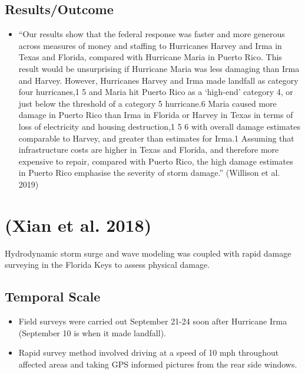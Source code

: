 \documentclass[
]{article}
\providecommand{\tightlist}{%
  \setlength{\itemsep}{0pt}\setlength{\parskip}{0pt}}
\begin{document}
\hypertarget{resultsoutcome-5}{%
\subsection{Results/Outcome}\label{resultsoutcome-5}}

\begin{itemize}
\tightlist
\item
  ``Our results show that the federal response was faster and more
  generous across measures of money and staffing to Hurricanes Harvey
  and Irma in Texas and Florida, compared with Hurricane Maria in Puerto
  Rico. This result would be unsurprising if Hurricane Maria was less
  damaging than Irma and Harvey. However, Hurricanes Harvey and Irma
  made landfall as category four hurricanes,1 5 and Maria hit Puerto
  Rico as a `high-end' category 4, or just below the threshold of a
  category 5 hurricane.6 Maria caused more damage in Puerto Rico than
  Irma in Florida or Harvey in Texas in terms of loss of electricity and
  housing destruction,1 5 6 with overall damage estimates comparable to
  Harvey, and greater than estimates for Irma.1 Assuming that
  infrastructure costs are higher in Texas and Florida, and therefore
  more expensive to repair, compared with Puerto Rico, the high damage
  estimates in Puerto Rico emphasise the severity of storm damage.''
  (Willison et al. 2019)
\end{itemize}

\hypertarget{xian2018brief}{%
\section{(Xian et al. 2018)}\label{xian2018brief}}

Hydrodynamic storm surge and wave modeling was coupled with rapid damage
surveying in the Florida Keys to assess physical damage.

\hypertarget{temporal-scale-25}{%
\subsection{Temporal Scale}\label{temporal-scale-25}}

\begin{itemize}
\tightlist
\item
  Field surveys were carried out September 21-24 soon after Hurricane
  Irma (September 10 is when it made landfall).
\item
  Rapid survey method involved driving at a speed of 10 mph throughout
  affected areas and taking GPS informed pictures from the rear side
  windows.
\end{itemize}
\end{document}

